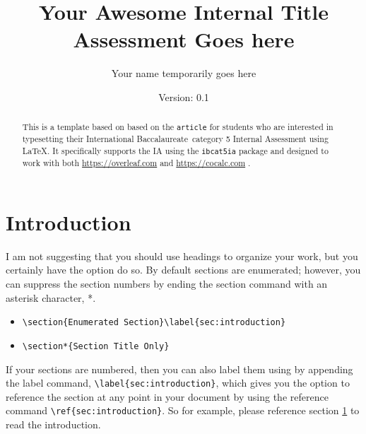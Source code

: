 \documentclass[a4paper,12pt]{article}
\title{Your Awesome Internal Title Assessment Goes here}
\author{Your name temporarily goes here}
\date{Version: 0.1}
\begin{document}
\maketitle

\begin{abstract}
  This is a template based on based on the \texttt{article} for students who are interested in typesetting their International Baccalaureate\texttrademark\, category 5 Internal Assessment using \LaTeX.  It specifically supports the IA using the \texttt{ibcat5ia} package and designed to work with both \url{https://overleaf.com} and \url{https://cocalc.com} . 
\end{abstract}

%
%

\section{Introduction}\label{sec:introduction}
I am not suggesting that you should use headings to organize your work, but you certainly have the option do so. By default sections are enumerated; however, you can suppress the section numbers by ending the section command with an asterisk character, *.

\begin{itemize}
    \item \verb!\section{Enumerated Section}\label{sec:introduction}!
    \item \verb!\section*{Section Title Only}!
\end{itemize}

If your sections are numbered, then you can also label them using by appending the label command,  \verb!\label{sec:introduction}!, which gives you the option to reference the section at any point in your document by using the reference command \verb!\ref{sec:introduction}!. So for example, please reference section \ref{sec:introduction} to read the introduction.
\end{document}
